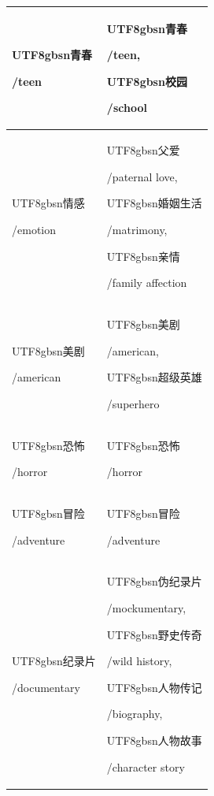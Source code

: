 \begin{table}[h]
\begin{tabularx}{\linewidth}{l|X}
    \midrule
    \begin{CJK*}{UTF8}{gbsn}青春\end{CJK*}/teen & \begin{CJK*}{UTF8}{gbsn}青春\end{CJK*}/teen, \begin{CJK*}{UTF8}{gbsn}校园\end{CJK*}/school \\
    \midrule
    \begin{CJK*}{UTF8}{gbsn}情感\end{CJK*}/emotion & \begin{CJK*}{UTF8}{gbsn}父爱\end{CJK*}/paternal love, \begin{CJK*}{UTF8}{gbsn}婚姻生活\end{CJK*}/matrimony, \begin{CJK*}{UTF8}{gbsn}亲情\end{CJK*}/family affection \\
    \midrule
    \begin{CJK*}{UTF8}{gbsn}美剧\end{CJK*}/american & \begin{CJK*}{UTF8}{gbsn}美剧\end{CJK*}/american, \begin{CJK*}{UTF8}{gbsn}超级英雄\end{CJK*}/superhero \\
    \midrule
    \begin{CJK*}{UTF8}{gbsn}恐怖\end{CJK*}/horror & \begin{CJK*}{UTF8}{gbsn}恐怖\end{CJK*}/horror \\
    \midrule
    \begin{CJK*}{UTF8}{gbsn}冒险\end{CJK*}/adventure & \begin{CJK*}{UTF8}{gbsn}冒险\end{CJK*}/adventure \\
    \midrule
    \begin{CJK*}{UTF8}{gbsn}纪录片\end{CJK*}/documentary & \begin{CJK*}{UTF8}{gbsn}伪纪录片\end{CJK*}/mockumentary, \begin{CJK*}{UTF8}{gbsn}野史传奇\end{CJK*}/wild history, \begin{CJK*}{UTF8}{gbsn}人物传记\end{CJK*}/biography, \begin{CJK*}{UTF8}{gbsn}人物故事\end{CJK*}/character story \\

\end{tabularx}
\end{table}
